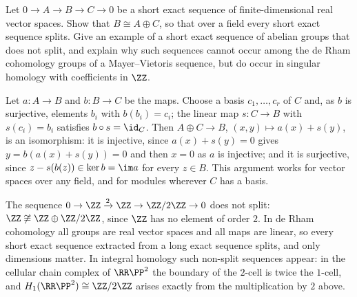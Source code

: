 \begin{exercise}\label{de-rham:exercise-dimension-in-sequences}
Let $0 \to A \to B \to C \to 0$ be a short exact sequence of finite-dimensional real vector spaces. Show that $B \cong A \oplus C$, so that over a field every short exact sequence splits. Give an example of a short exact
sequence of abelian groups that does not split, and explain why such sequences cannot occur among the de Rham cohomology groups of a Mayer--Vietoris sequence, but do occur in singular homology with
coefficients in $\ZZ$.
\end{exercise}

\begin{solution}
Let $a \colon A \to B$ and $b \colon B \to C$ be the maps. Choose a basis $c_1, \ldots, c_r$ of $C$ and, as $b$ is surjective, elements $b_i$ with $b(b_i) = c_i$; the linear map $s \colon C \to B$ with $s(c_i) = b_i$ satisfies
$b \circ s = \id_C$. Then $A \oplus C \to B$, $(x, y) \mapsto a(x) + s(y)$, is an isomorphism: it is injective, since $a(x) + s(y) = 0$ gives $y = b(a(x) + s(y)) = 0$ and then $x = 0$ as $a$ is injective; and it is surjective, since
$z - s(b(z)) \in \ker b = \im a$ for every $z \in B$. This argument works for vector spaces over any field, and for modules wherever $C$ has a basis.

The sequence $0 \to \ZZ \xrightarrow{2} \ZZ \to \ZZ/2\ZZ \to 0$ does not split: $\ZZ \not\cong \ZZ \oplus \ZZ/2\ZZ$, since $\ZZ$ has no element of order $2$. In de Rham cohomology all groups are real vector spaces and all
maps are linear, so every short exact sequence extracted from a long exact sequence splits, and only dimensions matter. In integral homology such non-split sequences appear: in the cellular chain complex of
$\RR\PP^2$ the boundary of the $2$-cell is twice the $1$-cell, and $H_1(\RR\PP^2) \cong \ZZ/2\ZZ$ arises exactly from the multiplication by $2$ above.
\end{solution}

